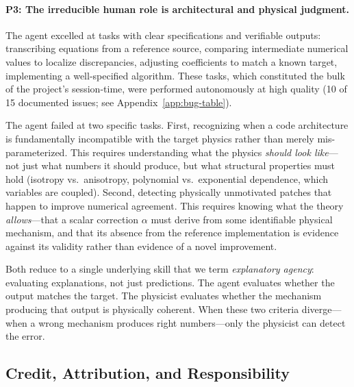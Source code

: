 \documentclass{article}
\begin{document}
\paragraph{P3: The irreducible human role is architectural and physical judgment.}

The agent excelled at tasks with clear specifications and verifiable outputs: transcribing equations from a reference source, comparing intermediate numerical values to localize discrepancies, adjusting coefficients to match a known target, implementing a well-specified algorithm. These tasks, which constituted the bulk of the project's session-time, were performed autonomously at high quality (10 of 15 documented issues; see Appendix~\ref{app:bug-table}).

The agent failed at two specific tasks. First, recognizing when a code architecture is fundamentally incompatible with the target physics rather than merely mis-parameterized. This requires understanding what the physics \emph{should look like}---not just what numbers it should produce, but what structural properties must hold (isotropy vs.\ anisotropy, polynomial vs.\ exponential dependence, which variables are coupled). Second, detecting physically unmotivated patches that happen to improve numerical agreement. This requires knowing what the theory \emph{allows}---that a scalar correction $\alpha$ must derive from some identifiable physical mechanism, and that its absence from the reference implementation is evidence against its validity rather than evidence of a novel improvement.

Both reduce to a single underlying skill that we term \emph{explanatory agency}: evaluating explanations, not just predictions. The agent evaluates whether the output matches the target. The physicist evaluates whether the mechanism producing that output is physically coherent. When these two criteria diverge---when a wrong mechanism produces right numbers---only the physicist can detect the error.

\subsection{Credit, Attribution, and Responsibility}
\label{sec:credit}
\end{document}
